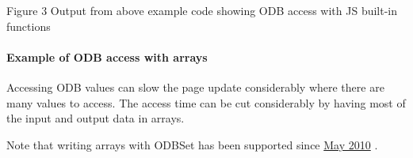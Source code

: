 \par
\par
\par
 \begin{center} Figure 3 Output from above example code showing ODB access with JS built-\/in functions \par
\par
\par
  \par
\par
\par
 \end{center} \hypertarget{RC_mhttpd_custom_ODB_access_examples_RC_mhttpd_js_example3}{}\paragraph{Example of ODB access with arrays}\label{RC_mhttpd_custom_ODB_access_examples_RC_mhttpd_js_example3}
Accessing ODB values can slow the page update considerably where there are many values to access. The access time can be cut considerably by having most of the input and output data in arrays.

 Note that writing arrays with ODBSet has been supported since \hyperlink{NDF_ndf_may_2010}{May 2010} . 


